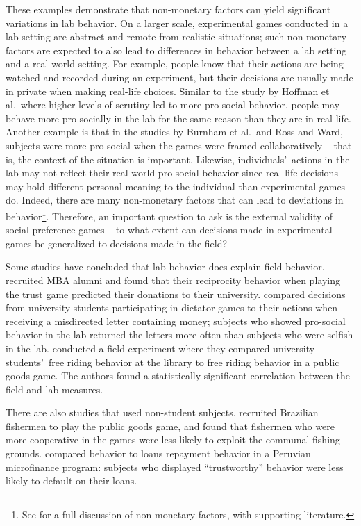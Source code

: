 \documentclass[12pt]{article}
\begin{document}
These examples demonstrate that non-monetary factors can yield significant variations in lab behavior. On a larger scale, experimental games conducted in a lab setting are abstract and remote from realistic situations; such non-monetary factors are expected to also lead to differences in behavior between a lab setting and a real-world setting. For example, people know that their actions are being watched and recorded during an experiment, but their decisions are usually made in private when making real-life choices. Similar to the study by Hoffman et al.\ where higher levels of scrutiny led to more pro-social behavior, people may behave more pro-socially in the lab for the same reason than they are in real life. Another example is that in the studies by Burnham et al.\ and Ross and Ward, subjects were more pro-social when the games were framed collaboratively -- that is, the context of the situation is important. Likewise, individuals\rq \ actions in the lab may not reflect their real-world pro-social behavior since real-life decisions may hold different personal meaning to the individual than experimental games do. Indeed, there are many non-monetary factors that can lead to deviations in behavior\footnote{See \cite{levitt_list_2007} for a full discussion of non-monetary factors, with supporting literature.}. Therefore, an important question to ask is the external validity of social preference games -- to what extent can decisions made in experimental games be generalized to decisions made in the field?

Some studies have concluded that lab behavior does explain field behavior. \cite{baran_2010} recruited MBA alumni and found that their reciprocity behavior when playing the trust game predicted their donations to their university. \cite{franzen_pointner_2012} compared decisions from university students participating in dictator games to their actions when receiving a misdirected letter containing money; subjects who showed pro-social behavior in the lab returned the letters more often than subjects who were selfish in the lab. \cite{englmaier_gebhardt_2011} conducted a field experiment where they compared university students\rq \ free riding behavior at the library to free riding behavior in a public goods game. The authors found a statistically significant correlation between the field and lab measures.

There are also studies that used non-student subjects. \cite{fehr_leibbrandt_2011} recruited Brazilian fishermen to play the public goods game, and found that fishermen who were more cooperative in the games were less likely to exploit the communal fishing grounds. \cite{karlan_2005} compared behavior to loans repayment behavior in a Peruvian microfinance program: subjects who displayed ``trustworthy'' behavior were less likely to default on their loans. 
\end{document}

